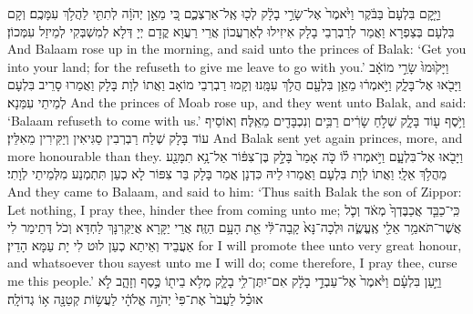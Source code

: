 {וַיָּ֤קׇם בִּלְעָם֙ בַּבֹּ֔קֶר וַיֹּ֙אמֶר֙ אֶל־שָׂרֵ֣י בָלָ֔ק לְכ֖וּ אֶֽל־אַרְצְכֶ֑ם כִּ֚י מֵאֵ֣ן יְהֹוָ֔ה לְתִתִּ֖י לַהֲלֹ֥ךְ עִמָּכֶֽם׃
}
{וְקָם בִּלְעָם בְּצַפְרָא וַאֲמַר לְרַבְרְבֵי בָלָק אִיזִילוּ לְאַרְעֲכוֹן אֲרֵי רַעֲוָא קֳדָם יְיָ דְּלָא לְמִשְׁבְּקִי לְמֵיזַל עִמְּכוֹן׃}
{And Balaam rose up in the morning, and said unto the princes of Balak: ‘Get you into your land; for the \lord\space refuseth to give me leave to go with you.’}{}
{וַיָּק֙וּמוּ֙ שָׂרֵ֣י מוֹאָ֔ב וַיָּבֹ֖אוּ אֶל־בָּלָ֑ק וַיֹּ֣אמְר֔וּ מֵאֵ֥ן בִּלְעָ֖ם הֲלֹ֥ךְ עִמָּֽנוּ׃}
{וְקָמוּ רַבְרְבֵי מוֹאָב וַאֲתוֹ לְוָת בָּלָק וַאֲמַרוּ סָרֵיב בִּלְעָם לְמֵיתֵי עִמַּנָא׃}
{And the princes of Moab rose up, and they went unto Balak, and said: ‘Balaam refuseth to come with us.’}{}
{וַיֹּ֥סֶף ע֖וֹד בָּלָ֑ק שְׁלֹ֣חַ שָׂרִ֔ים רַבִּ֥ים וְנִכְבָּדִ֖ים מֵאֵֽלֶּה׃}
{וְאוֹסֵיף עוֹד בָּלָק שְׁלַח רַבְרְבִין סַגִּיאִין וְיַקִּירִין מֵאִלֵּין׃}
{And Balak sent yet again princes, more, and more honourable than they.}{}
{וַיָּבֹ֖אוּ אֶל־בִּלְעָ֑ם וַיֹּ֣אמְרוּ ל֗וֹ כֹּ֤ה אָמַר֙ בָּלָ֣ק בֶּן־צִפּ֔וֹר אַל־נָ֥א תִמָּנַ֖ע מֵהֲלֹ֥ךְ אֵלָֽי׃}
{וַאֲתוֹ לְוָת בִּלְעָם וַאֲמַרוּ לֵיהּ כִּדְנָן אֲמַר בָּלָק בַּר צִפּוֹר לָא כְעַן תִּתְמְנַע מִלְּמֵיתֵי לְוָתִי׃}
{And they came to Balaam, and said to him: ‘Thus saith Balak the son of Zippor: Let nothing, I pray thee, hinder thee from coming unto me;}{}
{כִּֽי־כַבֵּ֤ד אֲכַבֶּדְךָ֙ מְאֹ֔ד וְכֹ֛ל אֲשֶׁר־תֹּאמַ֥ר אֵלַ֖י אֶֽעֱשֶׂ֑ה וּלְכָה־נָּא֙ קָֽבָה־לִּ֔י אֵ֖ת הָעָ֥ם הַזֶּֽה׃
}
{אֲרֵי יַקָּרָא אֲיַקְּרִנָּךְ לַחְדָּא וְכֹל דְּתֵימַר לִי אַעֲבֵיד וְאֵיתַא כְעַן לוּט לִי יָת עַמָּא הָדֵין׃}
{for I will promote thee unto very great honour, and whatsoever thou sayest unto me I will do; come therefore, I pray thee, curse me this people.’}{}
{וַיַּ֣עַן בִּלְעָ֗ם וַיֹּ֙אמֶר֙ אֶל־עַבְדֵ֣י בָלָ֔ק אִם־יִתֶּן־לִ֥י בָלָ֛ק מְלֹ֥א בֵית֖וֹ כֶּ֣סֶף וְזָהָ֑ב לֹ֣א אוּכַ֗ל לַעֲבֹר֙ אֶת־פִּי֙ יְהֹוָ֣ה אֱלֹהָ֔י לַעֲשׂ֥וֹת קְטַנָּ֖ה א֥וֹ גְדוֹלָֽה׃
}
